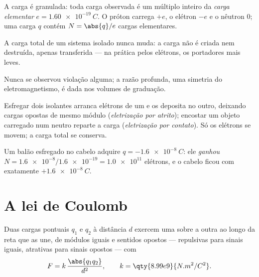 \begin{definition}\label{def:g11:fundamental-interactions:elementary}
A carga é granulada: toda carga observada é um múltiplo inteiro da
\emph{carga elementar} $e = \qty{1.60e-19}{C}$. O
próton carrega $+e$, o elétron $-e$ e o nêutron $0$; uma carga $q$ contém
$N = \abs{q}/e$ cargas elementares.
\end{definition}

\begin{proposition}\label{prop:g11:fundamental-interactions:conservation}
A carga total de um sistema isolado nunca muda: a carga não é criada nem
destruída, apenas transferida --- na prática pelos elétrons, os
portadores mais leves.
\end{proposition}
\admitted

\begin{remark}\label{rem:g11:fundamental-interactions:conservation}
Nunca se observou violação alguma; a razão profunda, uma simetria do
eletromagnetismo, é dada nos volumes de graduação.
\end{remark}

\begin{definition}\label{def:g11:fundamental-interactions:charging}
Esfregar dois isolantes arranca elétrons de um e os deposita no outro,
deixando cargas opostas de mesmo módulo (\emph{eletrização por
atrito}); encostar um objeto carregado num
neutro reparte a carga (\emph{eletrização por contato}). Só os elétrons se movem; a carga total se conserva.
\end{definition}

\begin{example}\label{ex:g11:fundamental-interactions:balloon}
Um balão esfregado no cabelo adquire $q = \qty{-1.6e-8}{C}$: ele
\emph{ganhou} $N = \num{1.6e-8} / \num{1.6e-19} = \num{1.0e11}$ elétrons,
e o cabelo ficou com exatamente $+\qty{1.6e-8}{C}$.
\end{example}

\section{A lei de Coulomb}

\begin{theorem}\label{thm:g11:fundamental-interactions:coulomb}
Duas cargas pontuais $q_1$ e $q_2$ à distância $d$ exercem uma sobre a
outra  ao longo da reta que as une, de módulos iguais e sentidos
opostos --- repulsivas para sinais iguais, atrativas para sinais opostos
--- com
\[
F = k\,\frac{\abs{q_1 q_2}}{d^{2}},
\qquad k = \qty{8.99e9}{N.m^2/C^2}.
\]
\end{theorem}
\admitted

